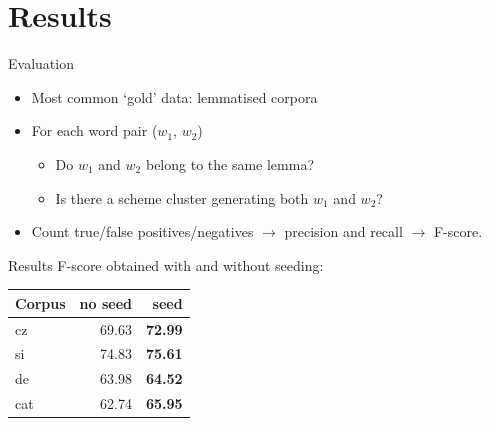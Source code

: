 \documentclass[hyperref={pdfencoding=unicode, unicode=true}, xcolor=dvipsnames]{beamer}
\begin{document}
%

\section{Results}

\begin{frame}{Evaluation}
\begin{itemize}
\item Most common `gold' data: lemmatised corpora
\item For each word pair ($w_1$, $w_2$)
    \begin{itemize}
    \item Do $w_1$ and $w_2$ belong to the same lemma?
    \item Is there a scheme cluster generating both $w_1$ and $w_2$?
    \end{itemize}
\item Count true/false positives/negatives $\rightarrow$ precision and recall $\rightarrow$ F-score.
\end{itemize}
\end{frame}

\begin{frame}{Results}
F-score obtained with and without seeding:

\begin{center}
\begin{tabular}{lrr}
\toprule
\bf Corpus & \bf no seed & \bf seed \\
\midrule
cz  & 69.63 & \bf 72.99 \\
si  & 74.83 & \bf 75.61 \\
de  & 63.98 & \bf 64.52 \\
cat & 62.74 & \bf 65.95 \\
\bottomrule
\end{tabular}
\end{center}
\end{frame}
\end{document}
